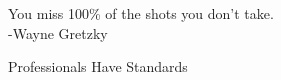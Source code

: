 
%



\begin{ntquote}
  You miss 100\% of the shots you don't take.\\-Wayne Gretzky
\end{ntquote}

\begin{ntquote}
  Professionals Have Standards
\end{ntquote}